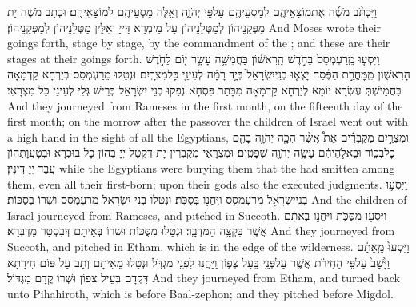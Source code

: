 {וַיִּכְתֹּ֨ב מֹשֶׁ֜ה אֶת\maqqaf מוֹצָאֵיהֶ֛ם לְמַסְעֵיהֶ֖ם עַל\maqqaf פִּ֣י יְהֹוָ֑ה וְאֵ֥לֶּה מַסְעֵיהֶ֖ם לְמוֹצָאֵיהֶֽם׃}
{וּכְתַב מֹשֶׁה יָת מַפְּקָנֵיהוֹן לְמַטְּלָנֵיהוֹן עַל מֵימְרָא דַּייָ וְאִלֵּין מַטְּלָנֵיהוֹן לְמַפְּקָנֵיהוֹן׃}
{And Moses wrote their goings forth, stage by stage, by the commandment of the \lord; and these are their stages at their goings forth.}{}
{וַיִּסְע֤וּ מֵֽרַעְמְסֵס֙ בַּחֹ֣דֶשׁ הָֽרִאשׁ֔וֹן בַּחֲמִשָּׁ֥ה עָשָׂ֛ר י֖וֹם לַחֹ֣דֶשׁ הָרִאשׁ֑וֹן מִֽמׇּחֳרַ֣ת הַפֶּ֗סַח יָצְא֤וּ בְנֵֽי\maqqaf יִשְׂרָאֵל֙ בְּיָ֣ד רָמָ֔ה לְעֵינֵ֖י כׇּל\maqqaf מִצְרָֽיִם׃}
{וּנְטַלוּ מֵרַעְמְסֵס בְּיַרְחָא קַדְמָאָה בַּחֲמֵישְׁתְּ עֶשְׂרָא יוֹמָא לְיַרְחָא קַדְמָאָה מִבָּתַר פִּסְחָא נְפַקוּ בְנֵי יִשְׂרָאֵל בְּרֵישׁ גְּלֵי לְעֵינֵי כָּל מִצְרָאֵי׃}
{And they journeyed from Rameses in the first month, on the fifteenth day of the first month; on the morrow after the passover the children of Israel went out with a high hand in the sight of all the Egyptians,}{}
{וּמִצְרַ֣יִם מְקַבְּרִ֗ים אֵת֩ אֲשֶׁ֨ר הִכָּ֧ה יְהֹוָ֛ה בָּהֶ֖ם כׇּל\maqqaf בְּכ֑וֹר וּבֵאלֹ֣הֵיהֶ֔ם עָשָׂ֥ה יְהֹוָ֖ה שְׁפָטִֽים׃}
{וּמִצְרָאֵי מְקַבְּרִין יָת דִּקְטַל יְיָ בְּהוֹן כָּל בּוּכְרָא וּבְטָעֲוָתְהוֹן עֲבַד יְיָ דִּינִין׃}
{while the Egyptians were burying them that the \lord\space had smitten among them, even all their first-born; upon their gods also the \lord\space executed judgments.}{}
{וַיִּסְע֥וּ בְנֵֽי\maqqaf יִשְׂרָאֵ֖ל מֵרַעְמְסֵ֑ס וַֽיַּחֲנ֖וּ בְּסֻכֹּֽת׃}
{וּנְטַלוּ בְנֵי יִשְׂרָאֵל מֵרַעְמְסֵס וּשְׁרוֹ בְסֻכּוֹת׃}
{And the children of Israel journeyed from Rameses, and pitched in Succoth.}{}
{וַיִּסְע֖וּ מִסֻּכֹּ֑ת וַיַּחֲנ֣וּ בְאֵתָ֔ם אֲשֶׁ֖ר בִּקְצֵ֥ה הַמִּדְבָּֽר׃}
{וּנְטַלוּ מִסֻּכּוֹת וּשְׁרוֹ בְּאֵיתָם דְּבִסְטַר מַדְבְּרָא׃}
{And they journeyed from Succoth, and pitched in Etham, which is in the edge of the wilderness.}{}
{וַיִּסְעוּ֙ מֵֽאֵתָ֔ם וַיָּ֙שׇׁב֙ עַל\maqqaf פִּ֣י הַחִירֹ֔ת אֲשֶׁ֥ר עַל\maqqaf פְּנֵ֖י בַּ֣עַל צְפ֑וֹן וַֽיַּחֲנ֖וּ לִפְנֵ֥י מִגְדֹּֽל׃}
{וּנְטַלוּ מֵאֵיתָם וְתָב עַל פּוֹם חִירָתָא דִּקְדָם בְּעֵיל צְפוֹן וּשְׁרוֹ קֳדָם מִגְדּוֹל׃}
{And they journeyed from Etham, and turned back unto Pihahiroth, which is before Baal-zephon; and they pitched before Migdol.}{}
